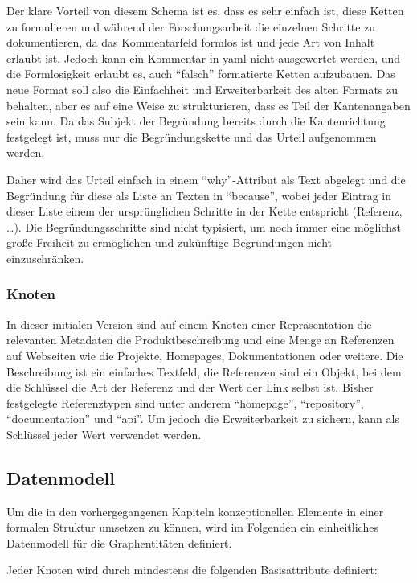 Der klare Vorteil von diesem Schema ist es, dass es sehr einfach ist, diese Ketten zu formulieren und während der Forschungsarbeit die einzelnen Schritte zu dokumentieren, da das Kommentarfeld formlos ist und jede Art von Inhalt erlaubt ist.
Jedoch kann ein Kommentar in \acrshort{yaml} nicht ausgewertet werden, und die Formlosigkeit erlaubt es, auch \enquote{falsch} formatierte Ketten aufzubauen.
Das neue Format soll also die Einfachheit und Erweiterbarkeit des alten Formats zu behalten, aber es auf eine Weise zu strukturieren, dass es Teil der Kantenangaben sein kann.
Da das Subjekt der Begründung bereits durch die Kantenrichtung festgelegt ist, muss nur die Begründungskette und das Urteil aufgenommen werden.

Daher wird das Urteil einfach in einem \enquote{why}-Attribut als Text abgelegt und die Begründung für diese als Liste an Texten in \enquote{because}, wobei jeder Eintrag in dieser Liste einem der ursprünglichen Schritte in der Kette entspricht (Referenz, \ldots).
Die Begründungsschritte sind nicht typisiert, um noch immer eine möglichst große Freiheit zu ermöglichen und zukünftige Begründungen nicht einzuschränken.

\subsubsection{Knoten}

In dieser initialen Version sind auf einem Knoten einer Repräsentation die relevanten Metadaten die Produktbeschreibung und eine Menge an Referenzen auf Webseiten wie die Projekte, Homepages, Dokumentationen oder weitere.
Die Beschreibung ist ein einfaches Textfeld, die Referenzen sind ein Objekt, bei dem die Schlüssel die Art der Referenz und der Wert der Link selbst ist.
Bisher festgelegte Referenztypen sind unter anderem \enquote{homepage}, \enquote{repository}, \enquote{documentation} und \enquote{api}.
Um jedoch die Erweiterbarkeit zu sichern, kann als Schlüssel jeder Wert verwendet werden.

\subsection{Datenmodell}

Um die in den vorhergegangenen Kapiteln konzeptionellen Elemente in einer formalen Struktur umsetzen zu können, wird im Folgenden ein einheitliches Datenmodell für die Graphentitäten definiert.

Jeder Knoten wird durch mindestens die folgenden Basisattribute definiert:

